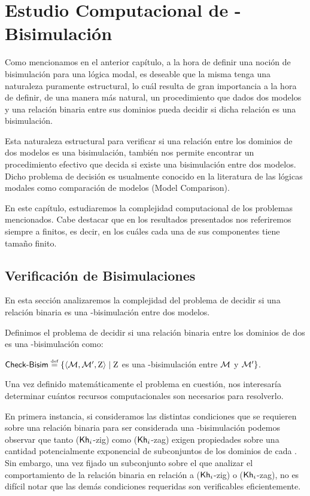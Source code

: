 \chapter{Estudio Computacional de \KHilogic-Bisimulación}

Como mencionamos en el anterior capítulo, a la hora de definir una noción de bisimulación para una lógica modal, 
es deseable que la misma tenga una naturaleza puramente estructural, lo cuál resulta de gran importancia a la hora de 
definir, de una manera más natural, un procedimiento que dados dos modelos y una relación binaria entre sus dominios pueda decidir 
si dicha relación es una bisimulación.

Esta naturaleza estructural para verificar si una relación entre los dominios de dos modelos es una bisimulación,
también nos permite encontrar un procedimiento efectivo que decida si existe una bisimulación entre dos modelos. 
Dicho problema de decisión es usualmente conocido en la literatura de las lógicas modales como comparación de modelos (Model Comparison).

En este capítulo, estudiaremos la complejidad computacional de los problemas mencionados. Cabe destacar que en los resultados presentados 
nos referiremos siempre a \ultss finitos, es decir, \ultss en los cuáles cada una de sus componentes tiene tamaño finito.

\section{Verificación de Bisimulaciones}

En esta sección analizaremos la complejidad del problema de decidir si una relación binaria es una \KHilogic-bisimulación entre dos modelos.  

\begin{definicion}
    Definimos el problema de decidir si una relación binaria entre los dominios de dos \ults es una \KHilogic-bisimulación como:
    \begin{center}
        $\CBisim \eqdef \{\tup{\model,\model',Z} \mid Z$ es una \KHilogic-bisimulación entre $\mathcal{M}$ y $\mathcal{M}'\}$.
    \end{center}
\end{definicion}

Una vez definido matemáticamente el problema en cuestión, nos interesaría determinar cuántos recursos computacionales son necesarios 
para resolverlo.

En primera instancia, si consideramos las distintas condiciones que se requieren sobre una relación binaria para ser considerada una 
\KHilogic-bisimulación podemos observar que tanto ($\mathsf{Kh}_i$-zig) como ($\mathsf{Kh}_i$-zag) exigen propiedades sobre una cantidad potencialmente 
exponencial de subconjuntos de los dominios de cada \ults. Sin embargo, una vez fijado un subconjunto sobre el que analizar el  
comportamiento de la relación binaria en relación a ($\mathsf{Kh}_i$-zig) o ($\mathsf{Kh}_i$-zag), no es difícil notar que las demás condiciones 
requeridas son verificables eficientemente.

